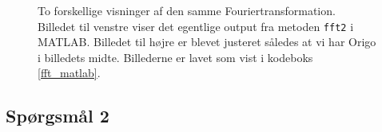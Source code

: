 \documentclass[a4paper, 10pt, danish, final]{article}
\begin{document}
\begin{figure}[!h]
    \centering
    \caption[]{To forskellige visninger af den samme
    Fouriertransformation. Billedet til venstre viser det egentlige
    output fra metoden \texttt{fft2} i MATLAB. Billedet til højre er
    blevet justeret således at vi har Origo i billedets midte.
    Billederne er lavet som vist i kodeboks \ref{fft_matlab}.}
    \label{ffts}
\end{figure}

\subsection*{Spørgsmål 2}



%
%

\clearpage
\appendix
\lstset{language=Matlab, basicstyle=\scriptsize,
    showstringspaces=false, numbers=left, stepnumber=1,
    numberstyle=\tiny, frame=none}
\end{document}
